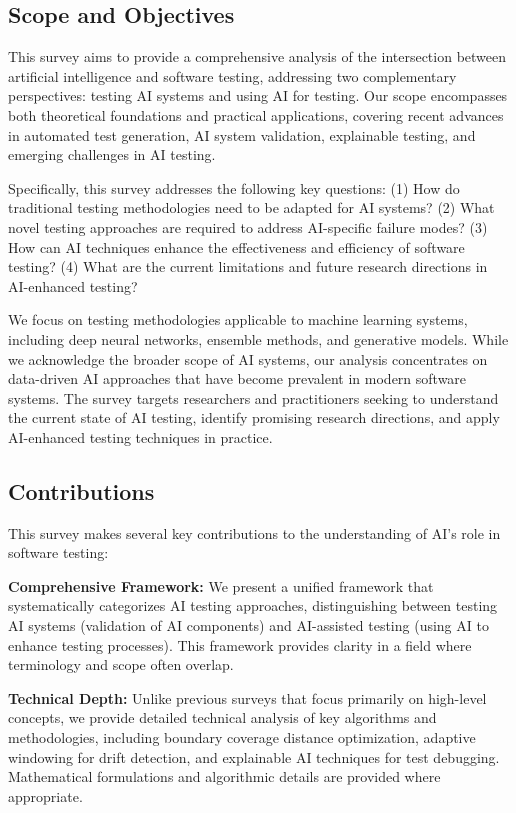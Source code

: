 \documentclass[manuscript,screen,review]{acmart}
\begin{document}
\subsection{Scope and Objectives}

This survey aims to provide a comprehensive analysis of the intersection between artificial intelligence and software testing, addressing two complementary perspectives: testing AI systems and using AI for testing. Our scope encompasses both theoretical foundations and practical applications, covering recent advances in automated test generation, AI system validation, explainable testing, and emerging challenges in AI testing.

Specifically, this survey addresses the following key questions: (1) How do traditional testing methodologies need to be adapted for AI systems? (2) What novel testing approaches are required to address AI-specific failure modes? (3) How can AI techniques enhance the effectiveness and efficiency of software testing? (4) What are the current limitations and future research directions in AI-enhanced testing?

We focus on testing methodologies applicable to machine learning systems, including deep neural networks, ensemble methods, and generative models. While we acknowledge the broader scope of AI systems, our analysis concentrates on data-driven AI approaches that have become prevalent in modern software systems. The survey targets researchers and practitioners seeking to understand the current state of AI testing, identify promising research directions, and apply AI-enhanced testing techniques in practice.

\subsection{Contributions}

This survey makes several key contributions to the understanding of AI's role in software testing:

\textbf{Comprehensive Framework:} We present a unified framework that systematically categorizes AI testing approaches, distinguishing between testing AI systems (validation of AI components) and AI-assisted testing (using AI to enhance testing processes). This framework provides clarity in a field where terminology and scope often overlap.

\textbf{Technical Depth:} Unlike previous surveys that focus primarily on high-level concepts, we provide detailed technical analysis of key algorithms and methodologies, including boundary coverage distance optimization, adaptive windowing for drift detection, and explainable AI techniques for test debugging. Mathematical formulations and algorithmic details are provided where appropriate.
\end{document}
